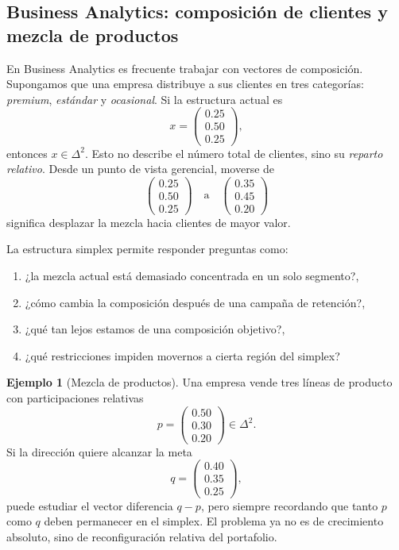 \documentclass[10pt,a4paper,oneside]{article}
\theoremstyle{plain}
\theoremstyle{definition}
\newtheorem{example}[theorem]{Ejemplo}
\theoremstyle{remark}
\begin{document}
\subsection{Business Analytics: composición de clientes y mezcla de productos}

En Business Analytics es frecuente trabajar con vectores de composición. Supongamos que una empresa distribuye a sus clientes en tres categorías: \emph{premium}, \emph{estándar} y \emph{ocasional}. Si la estructura actual es
\[
x=
\begin{pmatrix}
0.25\\0.50\\0.25
\end{pmatrix},
\]
entonces $x\in\Delta^2$. Esto no describe el número total de clientes, sino su \emph{reparto relativo}. Desde un punto de vista gerencial, moverse de
\[
\begin{pmatrix}
0.25\\0.50\\0.25
\end{pmatrix}
\quad \text{a} \quad
\begin{pmatrix}
0.35\\0.45\\0.20
\end{pmatrix}
\]
significa desplazar la mezcla hacia clientes de mayor valor.

La estructura simplex permite responder preguntas como:
\begin{enumerate}[label=\textup{(\arabic*)}]
\item ¿la mezcla actual está demasiado concentrada en un solo segmento?,
\item ¿cómo cambia la composición después de una campaña de retención?,
\item ¿qué tan lejos estamos de una composición objetivo?,
\item ¿qué restricciones impiden movernos a cierta región del simplex?
\end{enumerate}

\begin{example}[Mezcla de productos]
Una empresa vende tres líneas de producto con participaciones relativas
\[
p=
\begin{pmatrix}
0.50\\0.30\\0.20
\end{pmatrix}
\in \Delta^2.
\]
Si la dirección quiere alcanzar la meta
\[
q=
\begin{pmatrix}
0.40\\0.35\\0.25
\end{pmatrix},
\]
puede estudiar el vector diferencia $q-p$, pero siempre recordando que tanto $p$ como $q$ deben permanecer en el simplex. El problema ya no es de crecimiento absoluto, sino de reconfiguración relativa del portafolio.
\end{example}
\end{document}
